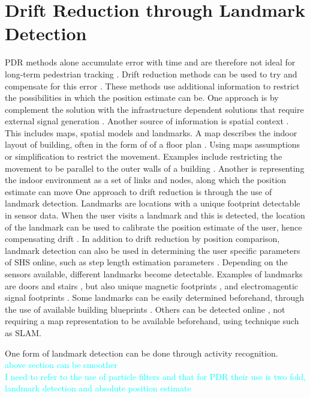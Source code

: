 \section{Drift Reduction through Landmark Detection}
PDR methods alone accumulate error with time and are therefore not ideal for long-term pedestrian tracking \cite{Hardegger2012}. Drift reduction methods can be used to try and compensate for this error \cite{MunozDiaz2019a}.  These methods use additional information to restrict the possibilities in which the position estimate can be. One approach is by complement the solution with the infrastructure dependent solutions that require external signal generation \cite{Gu2019}. Another source of information is spatial context \cite{Gu2019}. This includes maps, spatial models and landmarks. A map describes the indoor layout of building, often in the form of of a floor plan \cite{Gu2019}. Using maps assumptions or simplification to restrict the movement. Examples include restricting the movement to be parallel to the outer walls of a building \cite{Abdulrahim2011}. Another is representing the indoor environment as a set of links and nodes, along which the position estimate can move \cite{Davidson2017,Jackermeier2018} 
One approach to drift reduction is through the use of landmark detection. Landmarks are locations with a unique footprint detectable in sensor data. When the user visits a landmark and this is detected, the location of the landmark can be used to calibrate the position estimate of the user, hence compensating drift \cite{Diaz2017}. In addition to drift reduction by position comparison, landmark detection can also be used in determining the user specific parameters of \ac{SHS} online, such as step length estimation parameters \cite{Gu2019,Shang2015}.  Depending on the sensors available, different landmarks become detectable. Examples of landmarks are doors and stairs \cite{Diaz2017,Gu2019,Torok2014}, but also unique magnetic footprints \cite{MunozDiaz2019}, and electromagentic signal footprints \cite{Gu2019}. Some landmarks can be easily determined beforehand, through the use of available building blueprints \cite{Gu2019}. Others can be detected online \cite{Hardegger2012, Hardegger2016}, not requiring a map representation to be available beforehand, using technique such as \ac{SLAM}. 

One form of landmark detection can be done through activity recognition. \\
\textcolor{cyan}{above section can be smoother} \\ \newline
\textcolor{cyan}{ I need to refer to the use of particle filters and that for PDR their use is two fold, landmark detection and absolute position estimate}

